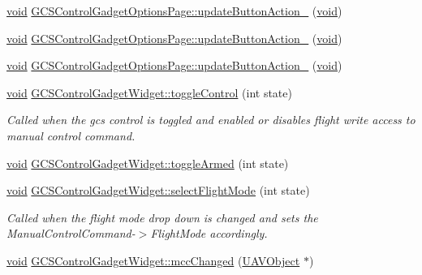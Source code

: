 \begin{DoxyCompactItemize}
\item 
\hyperlink{group___u_a_v_objects_plugin_ga444cf2ff3f0ecbe028adce838d373f5c}{void} \hyperlink{group___g_c_s_control_gadget_plugin_ga90dee04d87421e1af638ad7b1dea6aa8}{\-G\-C\-S\-Control\-Gadget\-Options\-Page\-::update\-Button\-Action\-\_} (\hyperlink{group___u_a_v_objects_plugin_ga444cf2ff3f0ecbe028adce838d373f5c}{void})
\item 
\hyperlink{group___u_a_v_objects_plugin_ga444cf2ff3f0ecbe028adce838d373f5c}{void} \hyperlink{group___g_c_s_control_gadget_plugin_ga918d017e724202b8224174985267c978}{\-G\-C\-S\-Control\-Gadget\-Options\-Page\-::update\-Button\-Action\-\_} (\hyperlink{group___u_a_v_objects_plugin_ga444cf2ff3f0ecbe028adce838d373f5c}{void})
\item 
\hyperlink{group___u_a_v_objects_plugin_ga444cf2ff3f0ecbe028adce838d373f5c}{void} \hyperlink{group___g_c_s_control_gadget_plugin_ga9b65e1b928dfafa1fa9d78aaa39c16df}{\-G\-C\-S\-Control\-Gadget\-Options\-Page\-::update\-Button\-Action\-\_} (\hyperlink{group___u_a_v_objects_plugin_ga444cf2ff3f0ecbe028adce838d373f5c}{void})
\item 
\hyperlink{group___u_a_v_objects_plugin_ga444cf2ff3f0ecbe028adce838d373f5c}{void} \hyperlink{group___g_c_s_control_gadget_plugin_gafe60b9408fffe8389ea6b994b3d5c84e}{\-G\-C\-S\-Control\-Gadget\-Widget\-::toggle\-Control} (int state)
\begin{DoxyCompactList}\small\item\em \-Called when the gcs control is toggled and enabled or disables flight write access to manual control command. \end{DoxyCompactList}\item 
\hyperlink{group___u_a_v_objects_plugin_ga444cf2ff3f0ecbe028adce838d373f5c}{void} \hyperlink{group___g_c_s_control_gadget_plugin_ga77dc1ed2344ac4440aa6348ee32d3104}{\-G\-C\-S\-Control\-Gadget\-Widget\-::toggle\-Armed} (int state)
\item 
\hyperlink{group___u_a_v_objects_plugin_ga444cf2ff3f0ecbe028adce838d373f5c}{void} \hyperlink{group___g_c_s_control_gadget_plugin_gab1ae0cb7fd085ad31a9a7b5d6923f8d4}{\-G\-C\-S\-Control\-Gadget\-Widget\-::select\-Flight\-Mode} (int state)
\begin{DoxyCompactList}\small\item\em \-Called when the flight mode drop down is changed and sets the \-Manual\-Control\-Command-\/$>$\-Flight\-Mode accordingly. \end{DoxyCompactList}\item 
\hyperlink{group___u_a_v_objects_plugin_ga444cf2ff3f0ecbe028adce838d373f5c}{void} \hyperlink{group___g_c_s_control_gadget_plugin_gabdcd9baf431d953b9e2c5f8f2c3d485c}{\-G\-C\-S\-Control\-Gadget\-Widget\-::mcc\-Changed} (\hyperlink{class_u_a_v_object}{\-U\-A\-V\-Object} $\ast$)

\end{DoxyCompactItemize}
